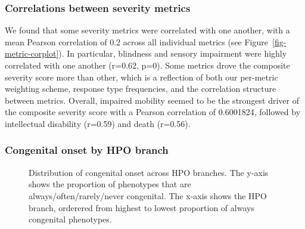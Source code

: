 \documentclass[
]{agujournal2019}
\begin{document}
\subsubsection{Correlations between severity
metrics}\label{correlations-between-severity-metrics}

We found that some severity metrics were correlated with one another,
with a mean Pearson correlation of 0.2 across all individual metrics
(see Figure~\ref{fig-metric-corplot}). In particular, blindness and
sensory impairment were highly correlated with one another (r=0.62,
p=0). Some metrics drove the composite severity score more than other,
which is a reflection of both our per-metric weighting scheme, response
type frequencies, and the correlation structure between metrics.
Overall, impaired mobility seemed to be the strongest driver of the
composite severity score with a Pearson correlation of 0.6001824,
followed by intellectual disability (r=0.59) and death (r=0.56).

\subsubsection{Congenital onset by HPO
branch}\label{congenital-onset-by-hpo-branch}

\label{cell-fig-congenital-branches}
\begin{figure}[H]


\caption{\label{fig-congenital-branches}Distribution of congenital onset
across HPO branches. The y-axis shows the proportion of phenotypes that
are always/often/rarely/never congenital. The x-axis shows the HPO
branch, orderered from highest to lowest proportion of always congenital
phenotypes.}

\end{figure}%
\end{document}
